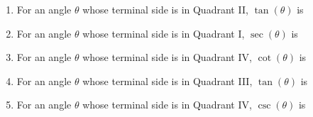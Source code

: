 \documentclass{ximera}
\author{Kenneth Berglund}
\begin{document}
\begin{exercise}
\begin{enumerate}
\item For an angle $\theta$ whose terminal side is in Quadrant II, $\tan(\theta)$ is
\begin{multipleChoice}
\end{multipleChoice}

\item For an angle $\theta$ whose terminal side is in Quadrant I, $\sec(\theta)$ is
\begin{multipleChoice}
\end{multipleChoice}

\item For an angle $\theta$ whose terminal side is in Quadrant IV, $\cot(\theta)$ is
\begin{multipleChoice}
\end{multipleChoice}

\item For an angle $\theta$ whose terminal side is in Quadrant III, $\tan(\theta)$ is
\begin{multipleChoice}
\end{multipleChoice}

\item For an angle $\theta$ whose terminal side is in Quadrant IV, $\csc(\theta)$ is
\begin{multipleChoice}
\end{multipleChoice}


\end{enumerate}

\end{exercise}
\end{document}
